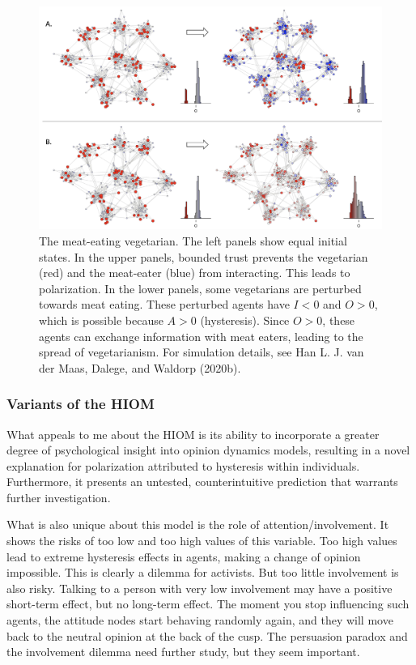 \documentclass[
  a4paper,
  DIV=11,
  numbers=noendperiod,
  oneside]{scrreprt}
\begin{document}
\begin{figure}

{\centering \includegraphics{media/ch7/image12.jpg}

}

\caption{\label{fig-ch7-img12-old-100}The meat-eating vegetarian. The
left panels show equal initial states. In the upper panels, bounded
trust prevents the vegetarian (red) and the meat-eater (blue) from
interacting. This leads to polarization. In the lower panels, some
vegetarians are perturbed towards meat eating. These perturbed agents
have \(I < 0\) and \(O > 0\), which is possible because \(A > 0\)
(hysteresis). Since \(O > 0\), these agents can exchange information
with meat eaters, leading to the spread of vegetarianism. For simulation
details, see Han L. J. van der Maas, Dalege, and Waldorp (2020b).}

\end{figure}

\hypertarget{sec-Variants-of-the-HIOM}{%
\subsubsection{Variants of the HIOM}\label{sec-Variants-of-the-HIOM}}

What appeals to me about the HIOM is its ability to incorporate a
greater degree of psychological insight into opinion dynamics models,
resulting in a novel explanation for polarization attributed to
hysteresis within individuals. Furthermore, it presents an untested,
counterintuitive prediction that warrants further investigation.

What is also unique about this model is the role of
attention/involvement. It shows the risks of too low and too high values
of this variable. Too high values lead to extreme hysteresis effects in
agents, making a change of opinion impossible. This is clearly a dilemma
for activists. But too little involvement is also risky. Talking to a
person with very low involvement may have a positive short-term effect,
but no long-term effect. The moment you stop influencing such agents,
the attitude nodes start behaving randomly again, and they will move
back to the neutral opinion at the back of the cusp. The persuasion
paradox and the involvement dilemma need further study, but they seem
important.
\end{document}
